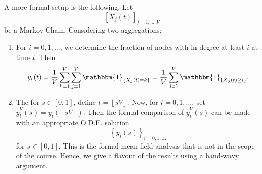 \begin{remark}
	A more formal setup is the following. Let
	\[
		\left[X_j(t)\right]_{j = 1, \ldots , V}
	\]
	be a Markov Chain. Considering two aggregations:
	\begin{enumerate}
		\item For \(i = 0, 1, \ldots \), we determine the fraction of nodes with in-degree at least \(i\) at time \(t\). Then
		      \[
			      y_{i}(t) = \frac{1}{V}\sum\limits_{k=1}^{V} \sum\limits_{j=1}^{V} \mathbbm{1}_{\{ X_{j}(t) = k \}} = \frac{1}{V}\sum\limits_{j=1}^{V} \mathbbm{1}_{\{ X_{j}(t)\geq i \}}.
		      \]
		\item The for \(s\in[0, 1]\), define \(t = \left\lfloor sV\right\rfloor \). Now, for \(i = 0, 1, \ldots \), set \(\widetilde{y}^V_t(s) = y_{i}(\left\lfloor sV\right\rfloor )\).
		      Then the formal comparison of \(\widetilde{y}^V_i(s)\) can be made with an appropriate O.D.E. solution
		      \[
			      \left\{y_{i}(s)\right\}_{i = 0, 1, \ldots }
		      \]
		      for \(s\in [0, 1]\). This is the formal mean-field analysis that is not in the scope of the course. Hence, we give a flavour of the
		      results using a hand-wavy argument.
	\end{enumerate}
\end{remark}
